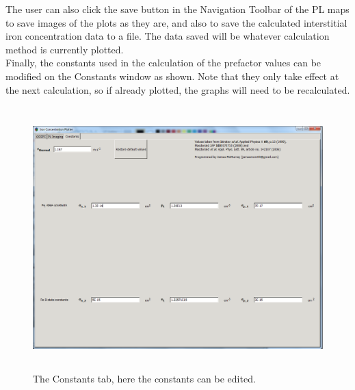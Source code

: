\documentclass[final,a4paper,oneside,12pt]{article}
\begin{document}
The user can also click the save button in the Navigation Toolbar of the PL maps to save images of the plots as they are, and also to save the calculated interstitial iron concentration data to a file. The data saved will be whatever calculation method is currently plotted.
\\

Finally, the constants used in the calculation of the prefactor values can be modified on the Constants window as shown. Note that they only take effect at the next calculation, so if already plotted, the graphs will need to be recalculated.

\begin{figure}[h!]
\includegraphics[height=4in]{2constants}
\caption{\label{figure3} The Constants tab, here the constants can be edited.}
\end{figure}
\end{document}
